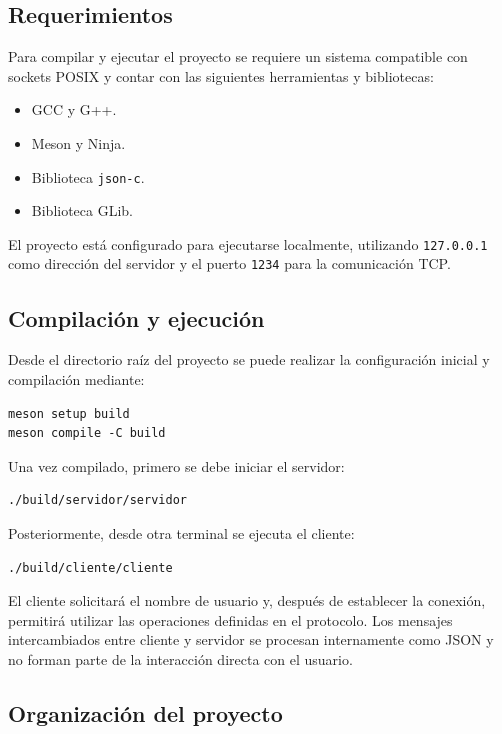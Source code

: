 \documentclass[12pt,a4paper]{article}
\begin{document}
\subsection{Requerimientos}

Para compilar y ejecutar el proyecto se requiere un sistema compatible con
sockets POSIX y contar con las siguientes herramientas y bibliotecas:

\begin{itemize}
    \item GCC y G++.
    \item Meson y Ninja.
    \item Biblioteca \texttt{json-c}.
    \item Biblioteca GLib.
\end{itemize}

El proyecto está configurado para ejecutarse localmente, utilizando
\texttt{127.0.0.1} como dirección del servidor y el puerto \texttt{1234}
para la comunicación TCP.

\subsection{Compilación y ejecución}

Desde el directorio raíz del proyecto se puede realizar la configuración
inicial y compilación mediante:

\begin{verbatim}
meson setup build
meson compile -C build
\end{verbatim}

Una vez compilado, primero se debe iniciar el servidor:

\begin{verbatim}
./build/servidor/servidor
\end{verbatim}

Posteriormente, desde otra terminal se ejecuta el cliente:

\begin{verbatim}
./build/cliente/cliente
\end{verbatim}

El cliente solicitará el nombre de usuario y, después de establecer la
conexión, permitirá utilizar las operaciones definidas en el protocolo.
Los mensajes intercambiados entre cliente y servidor se procesan
internamente como JSON y no forman parte de la interacción directa con el
usuario.

\subsection{Organización del proyecto}
\end{document}
